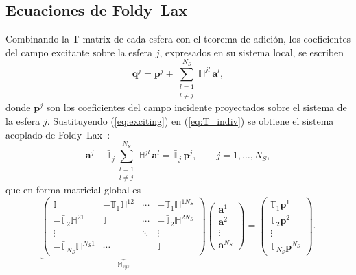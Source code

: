 \subsection{Ecuaciones de Foldy--Lax}
 
Combinando la T-matrix de cada esfera con el teorema de adición, los
coeficientes del campo excitante sobre la esfera $j$, expresados en su
sistema local, se escriben
\begin{equation}
\label{eq:exciting}
  \mathbf{q}^{j}
  = \mathbf{p}^{j}
  + \sum_{\substack{l=1\\l\neq j}}^{N_S}
    \mathbb{H}^{jl}\,\mathbf{a}^{l},
\end{equation}
donde $\mathbf{p}^{j}$ son los coeficientes del campo incidente
proyectados sobre el sistema de la esfera $j$. Sustituyendo
(\ref{eq:exciting}) en (\ref{eq:T_indiv}) se obtiene el sistema acoplado
de Foldy--Lax~\cite{Foldy1945,Lax1951,Mackowski1991,Mackowski1996}:
\begin{equation}
\label{eq:foldy-lax}
  \mathbf{a}^{j}
  - \bar{\mathbb{T}}_j \sum_{\substack{l=1\\l\neq j}}^{N_S}
    \mathbb{H}^{jl}\,\mathbf{a}^{l}
  = \bar{\mathbb{T}}_j\,\mathbf{p}^{j},
  \qquad j = 1,\ldots,N_S,
\end{equation}
que en forma matricial global es
\begin{equation}
\label{eq:foldy-lax-global}
  \underbrace{
  \begin{pmatrix}
    \mathbb{I}                     & -\bar{\mathbb{T}}_1\mathbb{H}^{12} & \cdots & -\bar{\mathbb{T}}_1\mathbb{H}^{1N_S} \\
    -\bar{\mathbb{T}}_2\mathbb{H}^{21} & \mathbb{I}                     & \cdots & -\bar{\mathbb{T}}_2\mathbb{H}^{2N_S} \\
    \vdots                         &                                & \ddots & \vdots                            \\
    -\bar{\mathbb{T}}_{N_S}\mathbb{H}^{N_S 1} & \cdots               &        & \mathbb{I}
  \end{pmatrix}
  }_{\mathbb{M}_{sys}}
  \begin{pmatrix}\mathbf{a}^1\\\mathbf{a}^2\\\vdots\\\mathbf{a}^{N_S}\end{pmatrix}
  =
  \begin{pmatrix}
    \bar{\mathbb{T}}_1\mathbf{p}^1\\
    \bar{\mathbb{T}}_2\mathbf{p}^2\\
    \vdots\\
    \bar{\mathbb{T}}_{N_S}\mathbf{p}^{N_S}
  \end{pmatrix}.
\end{equation}
 
